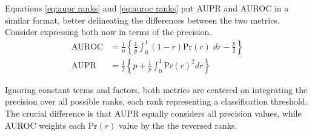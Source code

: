 Equations \ref{eq:aupr ranks} and \ref{eq:auroc ranks} put AUPR and AUROC in a similar format, better delineating the differences between the two metrics. Consider expressing both now in terms of the precision.
%
\begin{align}
    \text{AUROC} &= \frac{1}{n} \left\{
        \frac{1}{p}\int_{0}^{1} (1 - r)\text{Pr}(r) \;dr - \frac{p}{2}
    \right\}\\
    \text{AUPR} &= \frac{1}{2} \left\{
        p + \frac{1}{p}\int_0^1 \text{Pr}(r)^2 dr
    \right\}
\end{align}
%
%

%
%
%
%
Ignoring constant terms and factors, both metrics are centered on integrating the precision over all possible ranks, each rank representing a classification threshold. The crucial difference is that AUPR equally considers all precision values, while AUROC weights each $\text{Pr}(r)$ value by the the reversed ranks.

